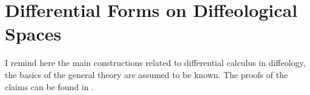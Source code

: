\documentclass[11pt,reqno]{amsart}
\theoremstyle{definition}
\begin{document}
  
  \section{Differential Forms on Diffeological Spaces}
  \label{Differential-forms-on-Diffeological-Spaces}
  
  \begin{text}
    I remind here the main constructions related to differential calculus in 
    diffeology, the basics of the  general theory are assumed to be known. 
    The proofs of the claims can be found in \cite{Piz05}.
  \end{text}
  
\end{document}
